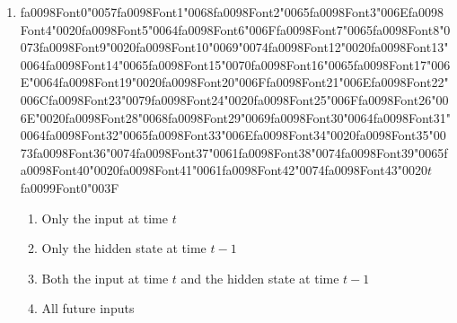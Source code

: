 \documentclass[12pt]{article}
\begin{document}
\begin{enumerate}[label=Q\arabic*.]
\begin{enumerate}[label=(\Alph*)]
    \item The current word given itself
    \item All words simultaneously
\end{enumerate}
\item {\csname fa0098Font0\endcsname\char"0057}{\csname fa0098Font1\endcsname\char"0068}{\csname fa0098Font2\endcsname\char"0065}{\csname fa0098Font3\endcsname\char"006E}{\csname fa0098Font4\endcsname\char"0020}{\csname fa0098Font5\endcsname\char"0064}{\csname fa0098Font6\endcsname\char"006F}{\csname fa0098Font7\endcsname\char"0065}{\csname fa0098Font8\endcsname\char"0073}{\csname fa0098Font9\endcsname\char"0020}{\csname fa0098Font10\endcsname\char"0069}{\char"0074}{\csname fa0098Font12\endcsname\char"0020}{\csname fa0098Font13\endcsname\char"0064}{\csname fa0098Font14\endcsname\char"0065}{\csname fa0098Font15\endcsname\char"0070}{\csname fa0098Font16\endcsname\char"0065}{\csname fa0098Font17\endcsname\char"006E}{\char"0064}{\csname fa0098Font19\endcsname\char"0020}{\csname fa0098Font20\endcsname\char"006F}{\csname fa0098Font21\endcsname\char"006E}{\csname fa0098Font22\endcsname\char"006C}{\csname fa0098Font23\endcsname\char"0079}{\csname fa0098Font24\endcsname\char"0020}{\csname fa0098Font25\endcsname\char"006F}{\csname fa0098Font26\endcsname\char"006E}{\char"0020}{\csname fa0098Font28\endcsname\char"0068}{\csname fa0098Font29\endcsname\char"0069}{\csname fa0098Font30\endcsname\char"0064}{\csname fa0098Font31\endcsname\char"0064}{\csname fa0098Font32\endcsname\char"0065}{\csname fa0098Font33\endcsname\char"006E}{\csname fa0098Font34\endcsname\char"0020}{\csname fa0098Font35\endcsname\char"0073}{\csname fa0098Font36\endcsname\char"0074}{\csname fa0098Font37\endcsname\char"0061}{\csname fa0098Font38\endcsname\char"0074}{\csname fa0098Font39\endcsname\char"0065}{\csname fa0098Font40\endcsname\char"0020}{\csname fa0098Font41\endcsname\char"0061}{\csname fa0098Font42\endcsname\char"0074}{\csname fa0098Font43\endcsname\char"0020}$t${\csname fa0099Font0\endcsname\char"003F}
\begin{enumerate}[label=(\Alph*)]
    \item Only the input at time $t$
    \item Only the hidden state at time $t-1$
    \item Both the input at time $t$ and the hidden state at time $t-1$
    \item All future inputs
\end{enumerate}

\end{enumerate}
\end{document}

